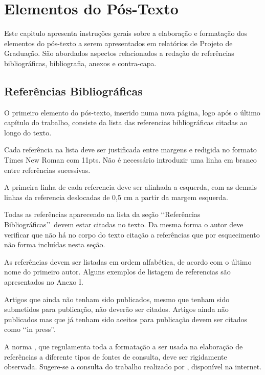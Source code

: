 \chapter[Elementos do Pós-Texto]{Elementos do Pós-Texto}

Este capitulo apresenta instruções gerais sobre a elaboração e formatação dos 
elementos do pós-texto a serem apresentados em relatórios de Projeto de 
Graduação. São abordados aspectos relacionados a redação de referências 
bibliográficas, bibliografia, anexos e contra-capa.

\section{Referências Bibliográficas}

O primeiro elemento do pós-texto, inserido numa nova página, logo após o último 
capítulo do trabalho, consiste da lista das referencias bibliográficas citadas 
ao longo do texto.

Cada referência na lista deve ser justificada entre margens e redigida no 
formato Times New Roman com 11pts. Não é necessário introduzir uma linha em 
branco entre referências sucessivas.

A primeira linha de cada referencia deve ser alinhada a esquerda, com as demais 
linhas da referencia deslocadas de 0,5 cm a partir da margem esquerda. 

Todas as referências aparecendo na lista da seção \lq\lq Referências 
Bibliográficas\rq\rq\ devem estar citadas no texto. Da mesma forma o autor deve 
verificar que não há no corpo do texto citação a referências que por 
esquecimento não forma incluídas nesta seção.

As referências devem ser listadas em ordem alfabética, de acordo com o último 
nome do primeiro autor. Alguns exemplos de listagem de referencias são 
apresentados no Anexo I.

Artigos que ainda não tenham sido publicados, mesmo que tenham sido submetidos 
para publicação, não deverão ser citados. Artigos ainda não publicados mas que 
já tenham sido aceitos para publicação devem ser citados como \lq\lq in 
press\rq\rq.

A norma \cite{NBR6034:2000}, que regulamenta toda a formatação a ser usada na 
elaboração de referências a diferente tipos de fontes de consulta, deve ser 
rigidamente observada. Sugere-se a consulta do trabalho realizado por 
\cite{tianCreditRiskAssessment2020}, disponível na internet.

